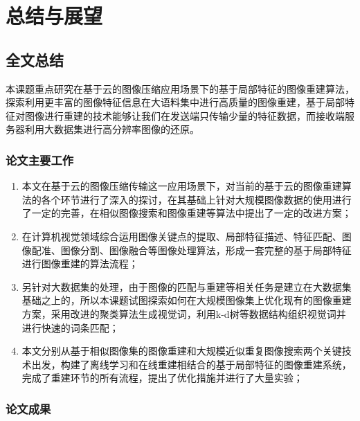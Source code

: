 
\chapter{总结与展望}

\section{全文总结}

本课题重点研究在基于云的图像压缩应用场景下的基于局部特征的图像重建算法，探索利用更丰富的图像特征信息在大语料集中进行高质量的图像重建，基于局部特征对图像进行重建的技术能够让我们在发送端只传输少量的特征数据，而接收端服务器利用大数据集进行高分辨率图像的还原。

\subsection{论文主要工作}

\begin{enumerate}
\item 本文在基于云的图像压缩传输这一应用场景下，对当前的基于云的图像重建算法的各个环节进行了深入的探讨，在其基础上针对大规模图像数据的使用进行了一定的完善，在相似图像搜索和图像重建等算法中提出了一定的改进方案；
\item 在计算机视觉领域综合运用图像关键点的提取、局部特征描述、特征匹配、图像配准、图像分割、图像融合等图像处理算法，形成一套完整的基于局部特征进行图像重建的算法流程；
\item 另针对大数据集的处理，由于图像的匹配与重建等相关任务是建立在大数据集基础之上的，所以本课题试图探索如何在大规模图像集上优化现有的图像重建方案，采用改进的聚类算法生成视觉词，利用k-d树等数据结构组织视觉词并进行快速的词条匹配；
\item 本文分别从基于相似图像集的图像重建和大规模近似重复图像搜索两个关键技术出发，构建了离线学习和在线重建相结合的基于局部特征的图像重建系统，完成了重建环节的所有流程，提出了优化措施并进行了大量实验；
\end{enumerate}

\subsection{论文成果}

